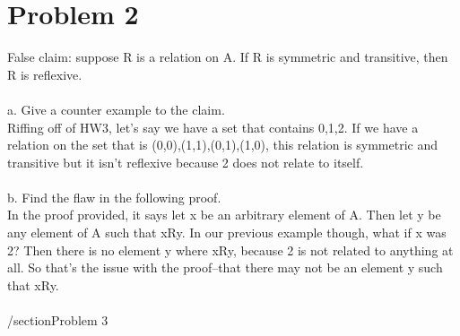 \documentclass{article}
\begin{document}
\section{Problem 2}
False claim: suppose R is a relation on A. If R is symmetric and transitive, then R is reflexive. \\\\
a. Give a counter example to the claim.
\\
Riffing off of HW3, let's say we have a set that contains {0,1,2}. If we have a relation on the set that is {(0,0),(1,1),(0,1),(1,0)}, this relation is symmetric and transitive but it isn't reflexive because 2 does not relate to itself.
\\\\
b. Find the flaw in the following proof.
\\
In the proof provided, it says let x be an arbitrary element of A. Then let y be any element of A such that xRy. In our previous example though, what if x was 2? Then there is no element y where xRy, because 2 is not related to anything at all. So that's the issue with the proof--that there may not be an element y such that xRy. 
\\\\
/section{Problem 3}
\end{document}
